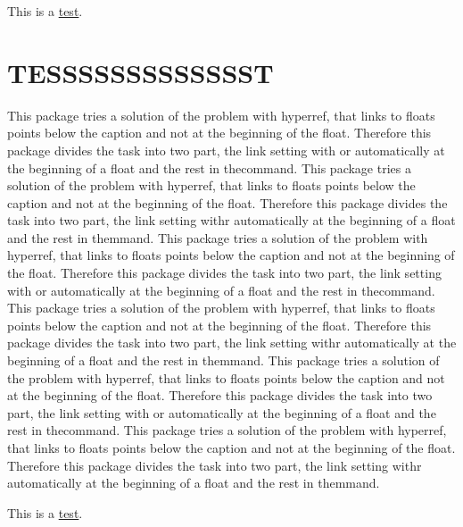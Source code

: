 \documentclass[a4paper,10pt]{article}
\begin{document}
This is a \hyperref[test]{test}.

\section{TESSSSSSSSSSSSST}
\label{test}

This package tries a solution of the problem with hyperref, that links to floats points below the caption and not at the beginning of the float. Therefore this package divides the task into two part, the link setting with or automatically at the beginning of a float and the rest in thecommand. This package tries a solution of the problem with hyperref, that links to floats points below the caption and not at the beginning of the float. Therefore this package divides the task into two part, the link setting withr automatically at the beginning of a float and the rest in themmand.
This package tries a solution of the problem with hyperref, that links to floats points below the caption and not at the beginning of the float. Therefore this package divides the task into two part, the link setting with or automatically at the beginning of a float and the rest in thecommand. This package tries a solution of the problem with hyperref, that links to floats points below the caption and not at the beginning of the float. Therefore this package divides the task into two part, the link setting withr automatically at the beginning of a float and the rest in themmand.
This package tries a solution of the problem with hyperref, that links to floats points below the caption and not at the beginning of the float. Therefore this package divides the task into two part, the link setting with or automatically at the beginning of a float and the rest in thecommand. This package tries a solution of the problem with hyperref, that links to floats points below the caption and not at the beginning of the float. Therefore this package divides the task into two part, the link setting withr automatically at the beginning of a float and the rest in themmand.

\newpage

This is a \hyperref[test]{test}.
\end{document}
